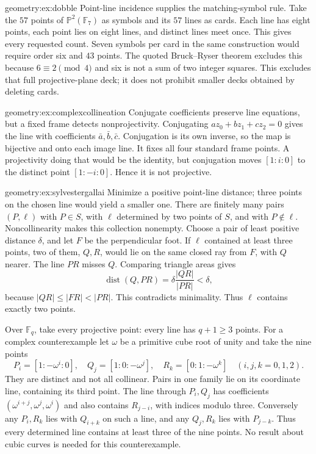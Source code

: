 \begin{solution}{geometry:ex:dobble}
\idea Point-line incidence supplies the matching-symbol rule.
\writeup Take the $57$ points of $\mathbb P^2(\mathbb F_7)$ as symbols and its $57$ lines as cards. Each line has eight points, each point lies on eight lines, and distinct lines meet once. This gives every requested count. Seven symbols per card in the same construction would require order six and $43$ points. The quoted Bruck--Ryser theorem excludes this because $6\equiv2\pmod4$ and six is not a sum of two integer squares. This excludes that full projective-plane deck; it does not prohibit smaller decks obtained by deleting cards.
\end{solution}
\begin{solution}{geometry:ex:complexcollineation}
\idea Conjugate coefficients preserve line equations, but a fixed frame detects nonprojectivity.
\writeup Conjugating $az_0+bz_1+cz_2=0$ gives the line with coefficients $\bar a,\bar b,\bar c$. Conjugation is its own inverse, so the map is bijective and onto each image line. It fixes all four standard frame points. A projectivity doing that would be the identity, but conjugation moves $[1:i:0]$ to the distinct point $[1:-i:0]$. Hence it is not projective.
\end{solution}
\begin{solution}{geometry:ex:sylvestergallai}
\idea Minimize a positive point-line distance; three points on the chosen line would yield a smaller one.
\writeup There are finitely many pairs $(P,\ell)$ with $P\in S$, with $\ell$ determined by two points of $S$, and with $P\notin\ell$. Noncollinearity makes this collection nonempty. Choose a pair of least positive distance $\delta$, and let $F$ be the perpendicular foot. If $\ell$ contained at least three points, two of them, $Q,R$, would lie on the same closed ray from $F$, with $Q$ nearer. The line $PR$ misses $Q$. Comparing triangle areas gives
\[
\operatorname{dist}(Q,PR)=\delta\frac{|QR|}{|PR|}<\delta,
\]
because $|QR|\le|FR|<|PR|$. This contradicts minimality. Thus $\ell$ contains exactly two points.

Over $\mathbb F_q$, take every projective point: every line has $q+1\ge3$ points. For a complex counterexample let $\omega$ be a primitive cube root of unity and take the nine points
\[
P_i=[1:-\omega^i:0],\quad Q_j=[1:0:-\omega^j],\quad
R_k=[0:1:-\omega^k]\quad(i,j,k=0,1,2).
\]
They are distinct and not all collinear. Pairs in one family lie on its coordinate line, containing its third point. The line through $P_i,Q_j$ has coefficients $(\omega^{i+j},\omega^j,\omega^i)$ and also contains $R_{j-i}$, with indices modulo three. Conversely any $P_i,R_k$ lies with $Q_{i+k}$ on such a line, and any $Q_j,R_k$ lies with $P_{j-k}$. Thus every determined line contains at least three of the nine points. No result about cubic curves is needed for this counterexample.
\end{solution}

